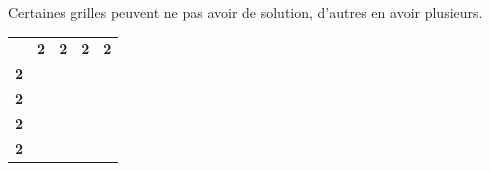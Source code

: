 \documentclass{article}
\begin{document}
Certaines grilles peuvent ne pas avoir de solution, d'autres en avoir plusieurs.
\begin{table}[h]
\centering
\begin{tabular}{ccccc}
\textbf{}                       & \textbf{2}                                    & \textbf{2}                                    & \textbf{2}                                    & \textbf{2}                                    \\ \cline{2-5} 
\multicolumn{1}{c|}{\textbf{2}} & \multicolumn{1}{c|}{}                         & \multicolumn{1}{c|}{}                         & \multicolumn{1}{c|}{\cellcolor[HTML]{000000}} & \multicolumn{1}{c|}{\cellcolor[HTML]{000000}} \\ \cline{2-5} 
\multicolumn{1}{c|}{\textbf{2}} & \multicolumn{1}{c|}{}                         & \multicolumn{1}{c|}{}                         & \multicolumn{1}{c|}{\cellcolor[HTML]{000000}} & \multicolumn{1}{c|}{\cellcolor[HTML]{000000}} \\ \cline{2-5} 
\multicolumn{1}{c|}{\textbf{2}} & \multicolumn{1}{c|}{\cellcolor[HTML]{000000}} & \multicolumn{1}{c|}{\cellcolor[HTML]{000000}} & \multicolumn{1}{c|}{}                         & \multicolumn{1}{c|}{}                         \\ \cline{2-5} 
\multicolumn{1}{l|}{\textbf{2}} & \multicolumn{1}{l|}{\cellcolor[HTML]{000000}} & \multicolumn{1}{l|}{\cellcolor[HTML]{000000}} & \multicolumn{1}{l|}{}                         & \multicolumn{1}{l|}{}                         \\ \cline{2-5} 
\end{tabular}
\end{table}
\end{document}
